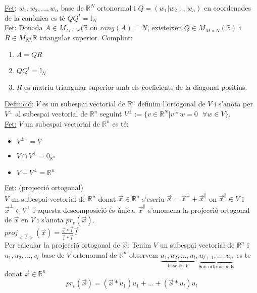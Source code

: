 \documentclass[../main.tex]{subfiles}
\begin{document}
    \underline{Fet}: $w_1, w_2, \dots, w_n$ base de $\mathbb{R}^N$ ortonormal i $Q = (w_1|w_2|\dots|w_n)$ en coordenades de la canònica es té $QQ^t = \mathbb{I}_N$\\
    \underline{Fet}: Donada $A \in M_{M\times N}(\mathbb{R}$ on $rang(A) = N$, existeixen $Q \in M_{M\times N}(\mathbb{R})$ i $R \in M_N(\mathbb{R}$ triangular superior. Complint:
    \begin{enumerate}
        \item $A = QR$
        \item $QQ^t = \mathbb{I}_N$
        \item $R$ és matriu triangular superior amb els coeficients de la diagonal positius.
    \end{enumerate}
    \underline{Definició}: $V$ es un subespai vectorial de $\mathbb{R}^n$ definim l'ortogonal de $V$ i s'anota per $V^\perp$ al subespai vectorial de $\mathbb{R}^n$ seguint $V^\perp := \{v \in \mathbb{R}^N | v*w = 0 \text{ } \forall w \in V \}$.\\
    \underline{Fet:} $V$ un subespai vectorial de $\mathbb{R}^n$ es té:
    \begin{itemize}
        \item $V^{\perp^\perp} = V$
        \item $V \cap V^\perp = 0_{\mathbb{R}^n}$
        \item $V + V^\perp = \mathbb{R}^n$
    \end{itemize}
    \underline{Fet}: (projecció ortogonal)\\
    $V$ un subespai vectorial de $\mathbb{R}^n$ donat $\vec{x} \in \mathbb{R}^n$ s'escriu $\Vec{x} = \Vec{x}^\perp + \Vec{x}^\parallel$ on $\vec{x}^\parallel \in V$ i $\Vec{x}^\perp \in V^\perp$ i aquesta descomposició és única. $\vec{x}^\parallel$ s'anomena la projecció ortogonal de $\Vec{x}$ en $V$ i s'anota $pr_v(\Vec{x})$.\\
    $proj_{<\vec{l}>}(\vec{x})=\frac{\Vec{x}*\vec{l}}{\Vec{l}*\vec{l}}\Vec{l}$\\
    Per calcular la projecció ortogonal de $\vec{x}$: Tenim $V$ un subespai vectorial de $\mathbb{R}^n$ i $u_1, u_2, \dots, v_l$ base de $V$ ortonormal de $\mathbb{R}^n$ observem $\underbrace{u_1, u_2, \dots, u_l}_{\text{base de } V},\underbrace{u_{l+1}, \dots, u_n}_\text{Son ortonormals}$ es te donat $\vec{x} \in \mathbb{R}^n$
    \begin{displaymath}
        pr_v(\vec{x}) = (\vec{x}*u_1)u_1+\dots+(\vec{x}*u_l)u_l
    \end{displaymath}
\end{document}
